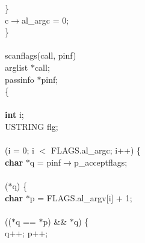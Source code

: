 \begin{flushleft}
\hspace*{3\indentation}\}\mbox{}\\
\hspace*{3\indentation}c$\rightarrow$al\_argc = 0;\mbox{}\\
\}\mbox{}\\
\mbox{}\\
scanflags(call, pinf)\mbox{}\\
\hspace*{3\indentation}{\bf struct} arglist $\ast$call;\mbox{}\\
\hspace*{3\indentation}{\bf struct} passinfo $\ast$pinf;\mbox{}\\
\{\mbox{}\\
\mbox{}\\
\hspace*{3\indentation}{\bf register} {\bf int} i;\mbox{}\\
\hspace*{3\indentation}USTRING flg;\mbox{}\\
\mbox{}\\
\hspace*{3\indentation}{\bf for} (i = 0; i $<$ FLAGS.al\_argc; i++) \{\mbox{}\\
\hspace*{6\indentation}{\bf register} {\bf char} $\ast$q = pinf$\rightarrow$p\_acceptflags;\mbox{}\\
\mbox{}\\
\hspace*{6\indentation}{\bf while} ($\ast$q)  \{\mbox{}\\
\hspace*{9\indentation}{\bf register} {\bf char} $\ast$p = FLAGS.al\_argv[i] + 1;\mbox{}\\
\mbox{}\\
\hspace*{9\indentation}{\bf while} (($\ast$q == $\ast$p) \&\& $\ast$q) \{\mbox{}\\
\hspace*{12\indentation}q++; p++;\mbox{}\\

\end{flushleft}
